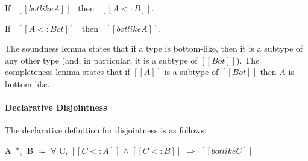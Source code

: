 \begin{lemma}
  If \ $[[botlike A]]$ \ then \ $[[A <: B]]$.
\label{lemma:union:bl-soundness}
\end{lemma}

\begin{comment}
\begin{proof}
  By induction on bottom-like relation.
  \begin{itemize}
    \item All cases are trivial to prove.
  \end{itemize}
\end{proof}
\end{comment}

\begin{lemma}
  If \ $[[A <: Bot]]$ \ then \ $[[botlike A]]$.
\label{lemma:union:bl-completeness}
\end{lemma}

\noindent The soundness lemma states that if a type is bottom-like, then it is
a subtype of any other type (and, in particular, it is a subtype of $[[Bot]]$).
The completeness lemma states that if $[[A]]$ is a subtype of $[[Bot]]$ then $A$
is bottom-like.

\begin{comment}
\begin{proof}
  By induction on type $[[A]]$.
  \begin{itemize}
    \item Cases $[[Top]]$, $[[Bot]]$, $[[Int]]$ and $[[A -> B]]$ are trivial to prove.
    \item Case $[[A \/ B]]$ requires \Cref{lemma:union:sub-or}.
  \end{itemize}
\end{proof}
\end{comment}

\paragraph{Declarative Disjointness}
The declarative definition for disjointness is as follows:

\begin{definition}
  A $*_s$ B $\Coloneqq$ $\forall$ C, $[[C <: A]]$ $\wedge$ $[[C <: B]]$ $\Longrightarrow$ $[[botlike C]]$
\label{def:union:disj}
\end{definition}

